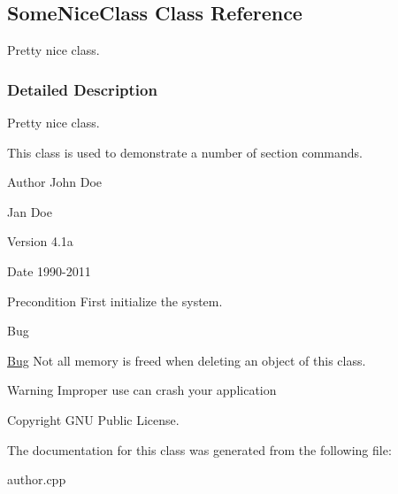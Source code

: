 \hypertarget{class_some_nice_class}{}\subsection{Some\+Nice\+Class Class Reference}
\label{class_some_nice_class}


Pretty nice class.  




\subsubsection{Detailed Description}
Pretty nice class. 

This class is used to demonstrate a number of section commands. \begin{DoxyAuthor}{Author}
John Doe 

Jan Doe 
\end{DoxyAuthor}
\begin{DoxyVersion}{Version}
4.\+1a 
\end{DoxyVersion}
\begin{DoxyDate}{Date}
1990-\/2011 
\end{DoxyDate}
\begin{DoxyPrecond}{Precondition}
First initialize the system. 
\end{DoxyPrecond}
\begin{DoxyRefDesc}{Bug}
\item[\hyperlink{bug__bug000001}{Bug}]Not all memory is freed when deleting an object of this class. \end{DoxyRefDesc}
\begin{DoxyWarning}{Warning}
Improper use can crash your application 
\end{DoxyWarning}
\begin{DoxyCopyright}{Copyright}
G\+NU Public License. 
\end{DoxyCopyright}


The documentation for this class was generated from the following file\+:\begin{DoxyCompactItemize}
\item 
author.\+cpp\end{DoxyCompactItemize}
